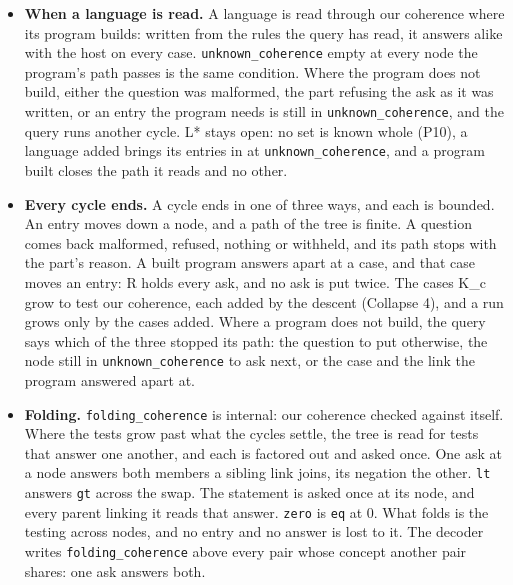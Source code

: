\begin{itemize}
\item \textbf{When a language is read.} A language is read through our coherence where its program builds: written from the rules the query has read, it answers alike with the host on every case. \texttt{unknown\_\allowbreak{}coherence} empty at every node the program's path passes is the same condition. Where the program does not build, either the question was malformed, the part refusing the ask as it was written, or an entry the program needs is still in \texttt{unknown\_\allowbreak{}coherence}, and the query runs another cycle. L* stays open: no set is known whole (P10), a language added brings its entries in at \texttt{unknown\_\allowbreak{}coherence}, and a program built closes the path it reads and no other.
\item \textbf{Every cycle ends.} A cycle ends in one of three ways, and each is bounded. An entry moves down a node, and a path of the tree is finite. A question comes back malformed, refused, nothing or withheld, and its path stops with the part's reason. A built program answers apart at a case, and that case moves an entry: R holds every ask, and no ask is put twice. The cases K\_\allowbreak{}c grow to test our coherence, each added by the descent (Collapse 4), and a run grows only by the cases added. Where a program does not build, the query says which of the three stopped its path: the question to put otherwise, the node still in \texttt{unknown\_\allowbreak{}coherence} to ask next, or the case and the link the program answered apart at.
\item \textbf{Folding.} \texttt{folding\_\allowbreak{}coherence} is internal: our coherence checked against itself. Where the tests grow past what the cycles settle, the tree is read for tests that answer one another, and each is factored out and asked once. One ask at a node answers both members a sibling link joins, its negation the other. \texttt{lt} answers \texttt{gt} across the swap. The statement is asked once at its node, and every parent linking it reads that answer. \texttt{zero} is \texttt{eq} at 0. What folds is the testing across nodes, and no entry and no answer is lost to it. The decoder writes \texttt{folding\_\allowbreak{}coherence} above every pair whose concept another pair shares: one ask answers both.

\end{itemize}
